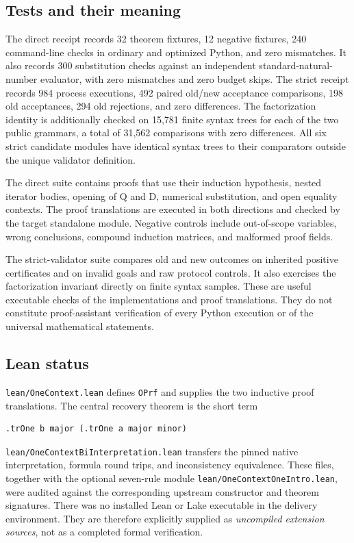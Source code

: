\documentclass[11pt,letterpaper]{article}
\theoremstyle{definition}\newtheorem{definition}[theorem]{Definition}
\theoremstyle{remark}\newtheorem{remark}[theorem]{Remark}
\newcommand{\file}[1]{\texttt{\nolinkurl{#1}}}
\newcommand{\code}[1]{\texttt{#1}}
\begin{document}
\subsection{Tests and their meaning}
The direct receipt records 32 theorem fixtures, 12 negative fixtures,
240 command-line checks in ordinary and optimized Python, and zero
mismatches. It also records 300 substitution checks against an independent
standard-natural-number evaluator, with zero mismatches and zero budget
skips. The strict receipt records 984 process executions, 492 paired
old/new acceptance comparisons, 198 old acceptances, 294 old rejections,
and zero differences. The factorization identity is additionally checked
on 15,781 finite syntax trees for each of the two public grammars, a total
of 31,562 comparisons with zero differences. All six strict candidate
modules have identical syntax trees to their comparators outside the
unique validator definition.

The direct suite contains proofs that use their induction hypothesis,
nested iterator bodies, opening of Q and D, numerical substitution,
and open equality contexts. The proof translations are executed in
both directions and checked by the target standalone module. Negative
controls include out-of-scope variables, wrong conclusions, compound
induction matrices, and malformed proof fields.

The strict-validator suite compares old and new outcomes on inherited
positive certificates and on invalid goals and raw protocol controls.
It also exercises the factorization invariant directly on finite syntax
samples. These are useful executable checks of the implementations and
proof translations. They do not constitute proof-assistant verification
of every Python execution or of the universal mathematical statements.

\subsection{Lean status}
\file{lean/OneContext.lean} defines \code{OPrf} and supplies the two
inductive proof translations. The central recovery theorem is the
short term
\begin{lstlisting}[language={}]
.trOne b major (.trOne a major minor)
\end{lstlisting}
\file{lean/OneContextBiInterpretation.lean} transfers the pinned native
interpretation, formula round trips, and inconsistency equivalence.
These files, together with the optional seven-rule module
\file{lean/OneContextOneIntro.lean}, were audited against the corresponding upstream constructor and
theorem signatures. There was no installed Lean or Lake executable in
the delivery environment. They are therefore explicitly supplied as
\emph{uncompiled extension sources}, not as a completed formal verification.
\end{document}

